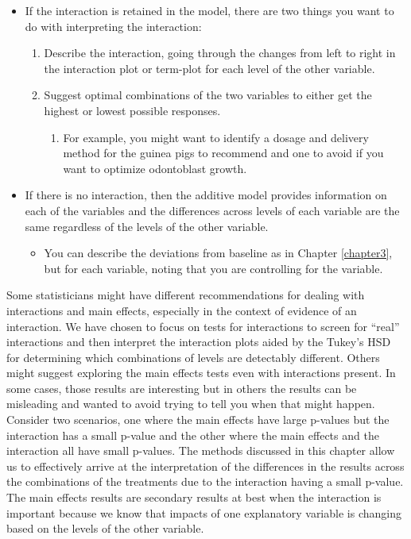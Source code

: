 \documentclass[]{book}
\providecommand{\tightlist}{%
  \setlength{\itemsep}{0pt}\setlength{\parskip}{0pt}}
\theoremstyle{definition}
\theoremstyle{definition}
\theoremstyle{remark}
\begin{document}
\begin{itemize}
\item
  If the interaction is retained in the model, there are two things you
  want to do with interpreting the interaction:

  \begin{enumerate}
  \def\labelenumi{\arabic{enumi}.}
  \item
    Describe the interaction, going through the changes from left to
    right in the interaction plot or term-plot for each level of the
    other variable.
  \item
    Suggest optimal combinations of the two variables to either get the
    highest or lowest possible responses.

    \begin{enumerate}
    \def\labelenumii{\alph{enumii}.}
    \tightlist
    \item
      For example, you might want to identify a dosage and delivery
      method for the guinea pigs to recommend and one to avoid if you
      want to optimize odontoblast growth.
    \end{enumerate}
  \end{enumerate}
\item
  If there is no interaction, then the additive model provides
  information on each of the variables and the differences across levels
  of each variable are the same regardless of the levels of the other
  variable.

  \begin{itemize}
  \tightlist
  \item
    You can describe the deviations from baseline as in Chapter
    \ref{chapter3}, but for each variable, noting that you are
    controlling for the variable.
  \end{itemize}
\end{itemize}

Some statisticians might have different recommendations for dealing with
interactions and main effects, especially in the context of evidence of
an interaction. We have chosen to focus on tests for interactions to
screen for ``real'' interactions and then interpret the interaction
plots aided by the Tukey's HSD for determining which combinations of
levels are detectably different. Others might suggest exploring the main
effects tests even with interactions present. In some cases, those
results are interesting but in others the results can be misleading and
wanted to avoid trying to tell you when that might happen. Consider two
scenarios, one where the main effects have large p-values but the
interaction has a small p-value and the other where the main effects and
the interaction all have small p-values. The methods discussed in this
chapter allow us to effectively arrive at the interpretation of the
differences in the results across the combinations of the treatments due
to the interaction having a small p-value. The main effects results are
secondary results at best when the interaction is important because we
know that impacts of one explanatory variable is changing based on the
levels of the other variable.
\end{document}

